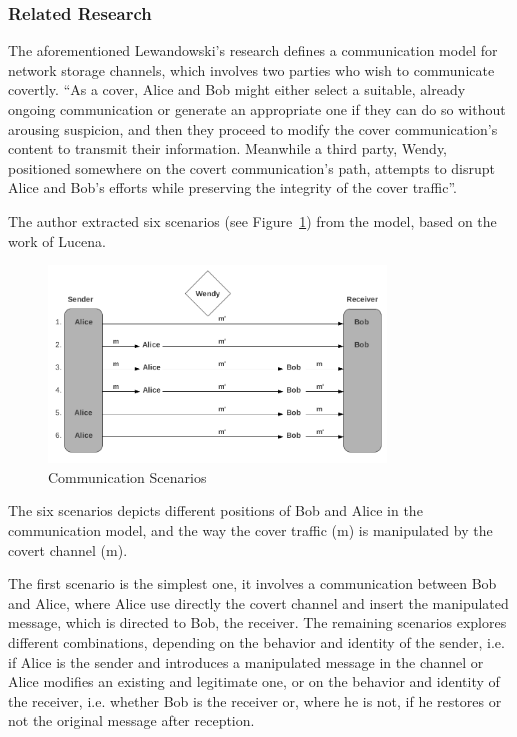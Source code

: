 \documentclass[12pt]{article}
\begin{document}
\subsubsection{Related Research}

The aforementioned Lewandowski's research defines a communication model for network storage channels, which involves two parties who wish to communicate covertly. ``As a cover, Alice and Bob might either select a suitable, already ongoing communication or generate an appropriate one if they can do so without arousing suspicion, and then they proceed to modify the cover communication’s content to transmit their information. Meanwhile a third party, Wendy, positioned somewhere on the covert communication’s path, attempts to disrupt Alice and Bob’s efforts while preserving the integrity of the cover traffic''.

The author extracted six scenarios (see Figure~\ref{fig:commScenarios}) from the model, based on the work of Lucena\cite{lucena}.

\begin{figure}[ht] 
\begin{center}
\includegraphics[width=0.8\textwidth]{communicationScenarios}
\caption{Communication Scenarios}
\label{fig:commScenarios}
\end{center}
\end{figure}

The six scenarios depicts different positions of Bob and Alice in the communication model, and the way the cover traffic (m) is manipulated by the covert channel (m\textprime).

The first scenario is the simplest one, it involves a communication between Bob and Alice, where Alice use directly the covert channel and insert the manipulated message, which is directed to Bob, the receiver. The remaining scenarios explores different combinations, depending on the behavior and identity of the sender, i.e. if Alice is the sender and introduces a manipulated message in the channel or Alice modifies an existing and legitimate one, or on the behavior and identity of the receiver, i.e. whether Bob is the receiver or, where he is not, if he restores or not the original message after reception.
\end{document}
